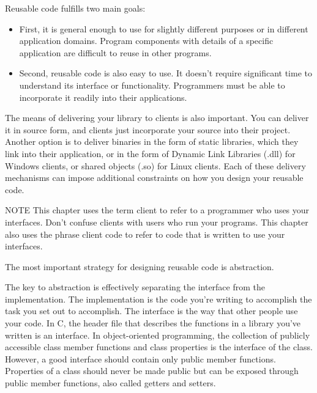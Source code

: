 
Reusable code fulfills two main goals:

\begin{itemize}
\item
First, it is general enough to use for slightly different purposes or in different application domains. Program components with details of a specific application are difficult to reuse in other programs.

\item
Second, reusable code is also easy to use. It doesn’t require significant time to understand its interface or functionality. Programmers must be able to incorporate it readily into their applications.
\end{itemize}

The means of delivering your library to clients is also important. You can deliver it in source form, and clients just incorporate your source into their project. Another option is to deliver binaries in the form of static libraries, which they link into their application, or in the form of Dynamic Link Libraries (.dll) for Windows clients, or shared objects (.so) for Linux clients. Each of these delivery mechanisms can impose additional constraints on how you design your reusable code.

\begin{myNotic}{NOTE}
This chapter uses the term client to refer to a programmer who uses your interfaces. Don’t confuse clients with users who run your programs. This chapter also uses the phrase client code to refer to code that is written to use your interfaces.
\end{myNotic}

The most important strategy for designing reusable code is abstraction.


The key to abstraction is effectively separating the interface from the implementation. The implementation is the code you’re writing to accomplish the task you set out to accomplish. The interface is the way that other people use your code. In C, the header file that describes the functions in a library you’ve written is an interface. In object-oriented programming, the collection of publicly accessible class member functions and class properties is the interface of the class. However, a good interface should contain only public member functions. Properties of a class should never be made public but can be exposed through public member functions, also called getters and setters.


